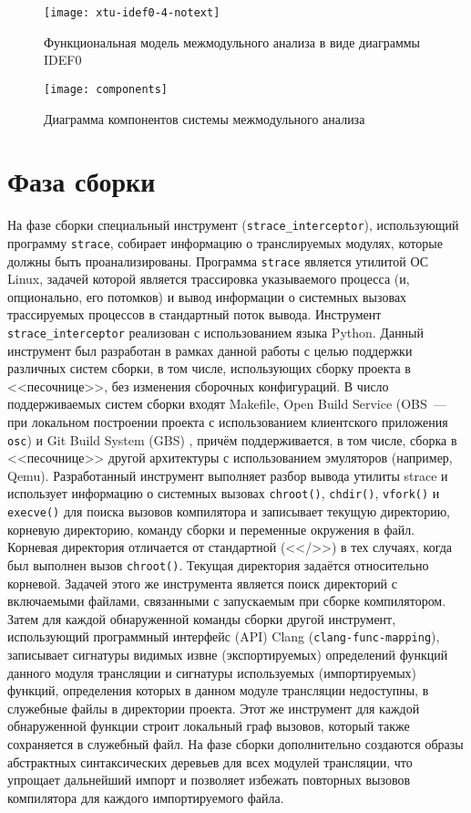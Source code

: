 \begin{figure}[h]
 \label{}
 \centering
 \texttt{[image: xtu-idef0-4-notext]}
 \caption{Функциональная модель межмодульного анализа в виде диаграммы IDEF0}\label{xtu-idef0}
\end{figure}

\begin{figure}[h]
 \label{}
 \centering
 \texttt{[image: components]}
 \caption{Диаграмма компонентов системы межмодульного анализа}\label{components}
\end{figure}


\section{Фаза сборки}

На фазе сборки специальный инструмент (\texttt{strace\_interceptor}), использующий программу \texttt{strace}, собирает информацию о транслируемых модулях, которые должны быть проанализированы. Программа \texttt{strace} является утилитой ОС Linux, задачей которой является трассировка указываемого процесса (и, опционально, его потомков) и вывод информации о системных вызовах трассируемых процессов в стандартный поток вывода. Инструмент \texttt{strace\_interceptor} реализован с использованием языка Python. Данный инструмент был разработан в рамках данной работы с целью поддержки различных систем сборки, в том числе, использующих сборку проекта в <<песочнице>>, без изменения сборочных конфигураций. В число поддерживаемых систем сборки входят Makefile, Open Build Service (OBS~--- при локальном построении проекта с использованием клиентского приложения \texttt{osc}) \cite{obs} и Git Build System (GBS) \cite{gbs}, причём поддерживается, в том числе, сборка в <<песочнице>> другой архитектуры с использованием эмуляторов (например, Qemu). Разработанный инструмент выполняет разбор вывода утилиты strace и использует информацию о системных вызовах \texttt{chroot()}, \texttt{chdir()}, \texttt{vfork()} и \texttt{execve()} для поиска вызовов компилятора и записывает текущую директорию, корневую директорию, команду сборки и переменные окружения в файл. Корневая директория отличается от стандартной (<</>>) в тех случаях, когда был выполнен вызов \texttt{chroot()}. Текущая директория задаётся относительно корневой. Задачей этого же инструмента является поиск директорий с включаемыми файлами, связанными с запускаемым при сборке компилятором. Затем для каждой обнаруженной команды сборки другой инструмент, использующий программный интерфейс (API) Clang (\texttt{clang-func-mapping}), записывает сигнатуры видимых извне (экспортируемых) определений функций данного модуля трансляции и сигнатуры используемых (импортируемых) функций, определения которых в данном модуле трансляции недоступны, в служебные файлы в директории проекта. Этот же инструмент для каждой обнаруженной функции строит локальный граф вызовов, который также сохраняется в служебный файл. На фазе сборки дополнительно создаются образы абстрактных синтаксических деревьев для всех модулей трансляции, что упрощает дальнейший импорт и позволяет избежать повторных вызовов компилятора для каждого импортируемого файла.

